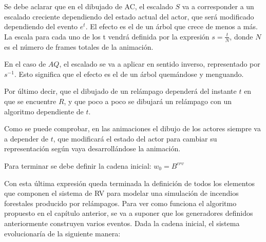 \documentclass{egpubl}
\begin{document}
Se debe aclarar que en el dibujado de AC, el escalado $S$ va a
corresponder a un escalado creciente dependiendo del estado actual del
actor, que ser\'a modificado dependiendo del evento
$e^{t}$. El efecto es el de un \'arbol que crece de menos
a m\'as. La escala para cada uno de los t vendr\'a definida por la
expresi\'on $s=\frac{t}{N}$, donde $N$ es el n\'umero de frames totales
de la animaci\'on.


En el caso de $AQ$, el escalado se va a aplicar en sentido inverso,
representado por $s^{-1}$. Esto significa que el
efecto es el de un \'arbol quem\'andose y menguando.

Por \'ultimo decir, que el dibujado de un rel\'ampago depender\'a del
instante $t$ en que se encuentre $R$, y que poco a poco se dibujar\'a un
rel\'ampago con un algoritmo dependiente de $t$.

Como se puede comprobar, en las animaciones el dibujo de los actores
siempre va a depender de $t$, que modificar\'a el estado del actor para
cambiar su representaci\'on seg\'un vaya desarroll\'andose la
animaci\'on.

Para terminar se debe definir la cadena inicial:
$w_{0} = B^{\mathit{crv}}$

Con esta \'ultima expresi\'on queda terminada la definici\'on de todos
los elementos que componen el sistema de RV para modelar una
simulaci\'on de incendios forestales producido por rel\'ampagos. Para
ver como funciona el algoritmo propuesto en el cap\'itulo anterior, se
va a suponer que los generadores definidos anteriormente construyen
varios eventos. Dada la cadena inicial, el sistema evolucionar\'ia de
la siguiente manera:
\end{document}
